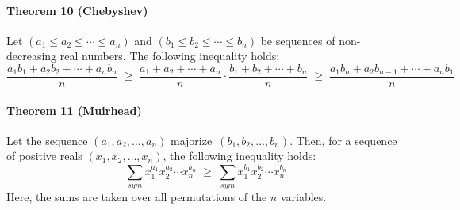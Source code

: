 \documentclass[11pt, reqno]{article}
\begin{document}
\begin{em}
\paragraph{Theorem 10 (Chebyshev)}
Let $(a_1 \leq a_2 \leq \cdots \leq a_n)$ and $(b_1 \leq b_2 \leq \cdots \leq b_n)$ be sequences of non-decreasing real numbers.
The following inequality holds:
\begin{equation*}
	\dfrac{a_1b_1 + a_2b_2 + \cdots + a_nb_n	}{n} \;\geq\; \dfrac{a_1 + a_2 + \cdots + a_n}{n}\cdot\dfrac{b_1 + b_2 + \cdots + b_n}{n} \;\geq\;
	\dfrac{a_1b_n + a_2b_{n-1} + \cdots + a_nb_1	}{n}
\end{equation*}

\paragraph{Theorem 11 (Muirhead)}
Let the sequence $(a_1, a_2, \dots, a_n)$ majorize\footnotemark \, $(b_1, b_2, \dots, b_n)$.
Then, for a sequence of positive reals $(x_1, x_2, \dots, x_n)$, the following inequality holds:
\begin{equation*}
	\sum_{sym}{x_1^{a_1} x_2^{a_2} \cdots x_n^{a_n}}		\;\geq\;		\sum_{sym}{x_1^{b_1} x_2^{b_2} \cdots x_n^{b_n}}	
\end{equation*}
Here, the sums are taken over all permutations of the $n$ variables.

\vfill
{}

\end{em}
\break
\end{document}
